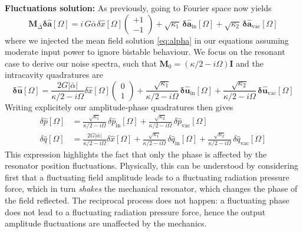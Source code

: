 \noindent \textbf{Fluctuations solution:} As previously, going to Fourier space now yields 
\begin{equation}
     \mathbf{M}_{\bar\Delta} \mathbf{\delta \hat{a}}[\Omega]  = i \,  G \bar{\alpha}_{\mathrm{}} \delta \hat{x}[\Omega]   \begin{pmatrix} +1 \\ -1\end{pmatrix}  +\sqrt{\kappa_{\mathrm{1}}} \, \mathbf{\delta \hat{a}_{\mathrm{in}}}[\Omega]  + \sqrt{\kappa_2} \, \mathbf{\delta \hat{a}_{\mathrm{vac}}}[\Omega] 
\end{equation}
where we injected the mean field solution \eqref{eq:alpha} in our equations assuming moderate input power to ignore bistable behaviour. We focus on the resonant case to derive our noise spectra, such that $\mathbf{M}_0 = (\kappa/2 - i\Omega) \mathbf{I}$  and the intracavity quadratures are
\begin{equation}
  \mathbf{\delta \hat{u}}[\Omega] =  \frac{2G|\bar \alpha|}{\kappa/2 - i\Omega}\delta \hat{x}[\Omega] \begin{pmatrix} 0\\ 1\end{pmatrix}  +\frac{\sqrt{\kappa_{\mathrm{1}}}}{\kappa/2 - i\Omega} \, \mathbf{\delta \hat{u}_{\mathrm{in}}}[\Omega]  +\frac{\sqrt{\kappa_{\mathrm{2}}}}{\kappa/2 - i\Omega} \, \mathbf{\delta \hat{u}_{\mathrm{vac}}}[\Omega]  
\end{equation}
Writing explicitely our amplitude-phase quadratures then gives 
\begin{equation}
  \begin{split}
    \delta \hat{p}[\Omega] &= \frac{\sqrt{\kappa_{\mathrm{1}}}}{\kappa/2 - i\Omega} \, \delta \hat{p}_{\mathrm{in}}[\Omega] + \frac{\sqrt{\kappa_{\mathrm{2}}}}{\kappa/2 - i\Omega} \, \delta \hat{p}_{\mathrm{vac}}[\Omega] \\
    \delta \hat{q}[\Omega] &=  \frac{2G|\bar \alpha|}{\kappa/2 - i\Omega}\delta \hat{x}[\Omega]  +\frac{\sqrt{\kappa_{\mathrm{1}}}}{\kappa/2 - i\Omega} \, \delta \hat{q}_{\mathrm{in}}[\Omega]  + \frac{\sqrt{\kappa_{\mathrm{2}}}}{\kappa/2 - i\Omega} \, \delta \hat{q}_{\mathrm{vac}}[\Omega] 
  \end{split}
   \label{eq:intra_quad}
\end{equation}
This expression highlights the fact that only the phase is affected by the resonator position fluctuations. Physically, this can be understood by considering first that a fluctuating field amplitude leads to a fluctuating radiation pressure force, which in turn \textit{shakes} the mechanical resonator, which changes the phase of the field reflected. The reciprocal process does not happen: a fluctuating phase does not lead to a fluctuating radiation pressure force, hence the output amplitude fluctuations are unaffected by the mechanics. \\

